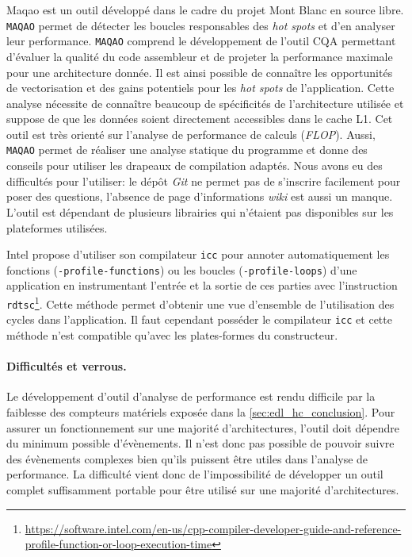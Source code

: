         Maqao \cite{Barthou2010} est un outil développé dans le cadre du projet Mont Blanc \cite{Puzovic2012} en source libre.  \verb=MAQAO= permet de détecter les boucles responsables des \textit{hot spots} et d’en analyser leur performance. \verb=MAQAO= comprend le développement de l’outil CQA \cite{Charif-Rubial2014} permettant d’évaluer la qualité du code assembleur et de projeter la performance maximale pour une architecture donnée.  Il est ainsi possible de connaître  les opportunités de vectorisation et des gains potentiels pour les \textit{hot spots} de l'application. Cette analyse nécessite de connaître beaucoup de spécificités de l'architecture utilisée et suppose de que les données soient directement accessibles dans le cache L1. Cet outil est très orienté sur l'analyse de performance de calculs (\textit{FLOP}). Aussi, \verb=MAQAO= permet de réaliser une analyse statique du programme et donne des conseils pour utiliser les drapeaux de compilation adaptés.
        Nous avons eu des difficultés pour l'utiliser: le dépôt \textit{Git} ne permet pas de s'inscrire facilement pour poser des questions, l'absence de page d'informations \textit{wiki} est aussi un manque. L'outil est dépendant de plusieurs librairies qui n'étaient pas disponibles sur les plateformes utilisées. 
        
        Intel propose d'utiliser son compilateur \verb=icc= pour annoter automatiquement les fonctions (\verb=-profile-functions=) ou les boucles (\verb=-profile-loops=) d'une application en instrumentant l'entrée et la sortie de ces parties avec l'instruction \verb=rdtsc=\footnote{\url{https://software.intel.com/en-us/cpp-compiler-developer-guide-and-reference-profile-function-or-loop-execution-time}}. Cette méthode permet d'obtenir une vue d'ensemble de l'utilisation des cycles dans l'application. Il faut cependant posséder le compilateur \verb=icc= et cette méthode n'est compatible qu'avec les plates-formes du constructeur. 
        
        
        \paragraph{Difficultés et verrous.} Le développement d'outil d'analyse de performance est rendu difficile par la faiblesse des compteurs matériels exposée dans la \autoref{sec:edl_hc_conclusion}. Pour assurer un fonctionnement sur une majorité d'architectures, l'outil doit dépendre du minimum possible d'évènements. Il n'est donc pas possible de pouvoir suivre des évènements complexes bien qu'ils puissent être utiles dans l'analyse de performance. La difficulté vient donc de l'impossibilité de développer un outil complet suffisamment portable pour être utilisé sur une majorité d'architectures. 
        

